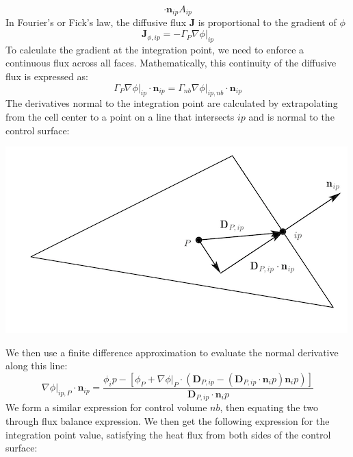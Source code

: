 \documentclass[11pt]{article}
\begin{document}
\begin{enumerate}
\begin{equation*}
\cdot \textbf{n}_{ip}A_{ip}
\end{equation*}
In Fourier's or Fick's law, the diffusive flux \(\textbf{J}\) is proportional to the gradient of \(\phi\)
\begin{equation*}
\textbf{J}_{\phi,ip} = -\Gamma_P \nabla \phi \biggr\rvert_{ip}
\end{equation*}
To calculate the gradient at the integration point, we need to enforce a continuous flux across all faces.
Mathematically, this continuity of the diffusive flux is expressed as:
\begin{equation*}
\Gamma_P \nabla \phi \biggr\rvert_{ip} \cdot \textbf{n}_{ip} =
\Gamma_{nb} \nabla \phi \biggr\rvert_{ip,nb} \cdot \textbf{n}_{ip}
\end{equation*}
The derivatives normal to the integration point are calculated by extrapolating from the cell center to a
point on a line that intersects \(ip\) and is normal to the control surface:
\begin{center}
\includegraphics[scale=2.0]{../pic/controlvolumederivative.png}
\end{center}
We then use a finite difference approximation to evaluate the normal derivative along this line:
\begin{equation*}
\nabla \phi\biggr\rvert_{ip,P} \cdot \textbf{n}_{ip} = \frac{\phi_ip - [\phi_P + \nabla \phi\rvert_P
\cdot (\textbf{D}_{P,ip}-(\textbf{D}_{P,ip} \cdot \textbf{n}_ip)\textbf{n}_ip)]}     
{\textbf{D}_{P,ip}\cdot\textbf{n}_ip}
\end{equation*}
We form a similar expression for control volume \(nb\), then equating the two through flux balance
expression.  We then get the following expression for the integration point value, satisfying the
heat flux from both sides of the control surface:
\begin{equation*}
\begin{aligned}

\end{aligned}
\end{equation*}
\end{enumerate}
\end{document}
